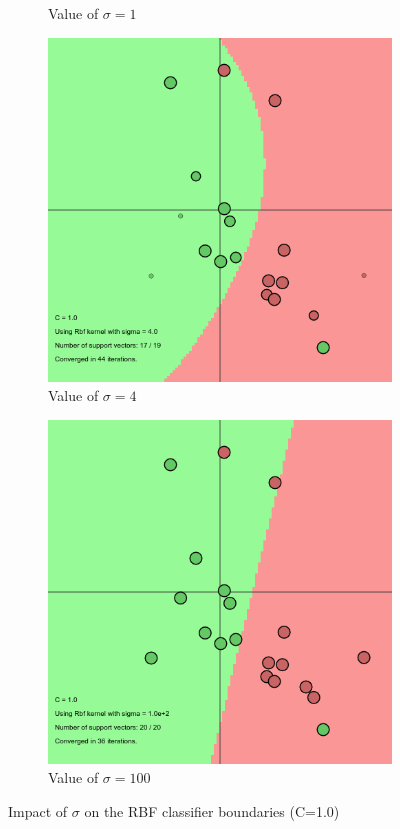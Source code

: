 \documentclass[11pt, a4paper]{article}
\begin{document}
\begin{figure}[H]
\begin{subfigure}{.25\textwidth}
      \caption{Value of $\sigma = 1$}
      \label{fig:rbfs2}
    \end{subfigure}%
    \begin{subfigure}{.25\textwidth}
      \centering
      \includegraphics[width=0.9\linewidth]{1-2-1-kernel_ssigma4.png}
      \caption{Value of $\sigma = 4$}
      \label{fig:rbfs3}
    \end{subfigure}%
    \begin{subfigure}{.25\textwidth}
      \centering
      \includegraphics[width=0.9\linewidth]{1-2-1-kernel_ssigma100.png}
      \caption{Value of $\sigma = 100$}
      \label{fig:rfbs4}
    \end{subfigure}
    \caption{Impact of $\sigma$ on the RBF classifier boundaries (C=1.0)}
    \label{fig:RBF_sigma}
\end{figure}
\end{document}

